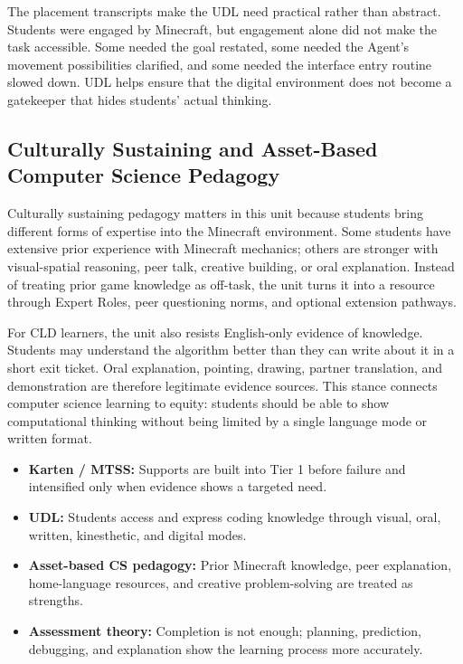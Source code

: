 \documentclass[12pt]{article}
\begin{document}
The placement transcripts make the UDL need practical rather than abstract. Students were engaged by Minecraft, but engagement alone did not make the task accessible. Some needed the goal restated, some needed the Agent's movement possibilities clarified, and some needed the interface entry routine slowed down. UDL helps ensure that the digital environment does not become a gatekeeper that hides students' actual thinking.

\subsection{Culturally Sustaining and Asset-Based Computer Science Pedagogy}
Culturally sustaining pedagogy matters in this unit because students bring different forms of expertise into the Minecraft environment. Some students have extensive prior experience with Minecraft mechanics; others are stronger with visual-spatial reasoning, peer talk, creative building, or oral explanation. Instead of treating prior game knowledge as off-task, the unit turns it into a resource through Expert Roles, peer questioning norms, and optional extension pathways.

For CLD learners, the unit also resists English-only evidence of knowledge. Students may understand the algorithm better than they can write about it in a short exit ticket. Oral explanation, pointing, drawing, partner translation, and demonstration are therefore legitimate evidence sources. This stance connects computer science learning to equity: students should be able to show computational thinking without being limited by a single language mode or written format.

\begin{designbox}
\begin{itemize}
\item \textbf{Karten / MTSS:} Supports are built into Tier 1 before failure and intensified only when evidence shows a targeted need.
\item \textbf{UDL:} Students access and express coding knowledge through visual, oral, written, kinesthetic, and digital modes.
\item \textbf{Asset-based CS pedagogy:} Prior Minecraft knowledge, peer explanation, home-language resources, and creative problem-solving are treated as strengths.
\item \textbf{Assessment theory:} Completion is not enough; planning, prediction, debugging, and explanation show the learning process more accurately.
\end{itemize}
\end{designbox}
\end{document}
